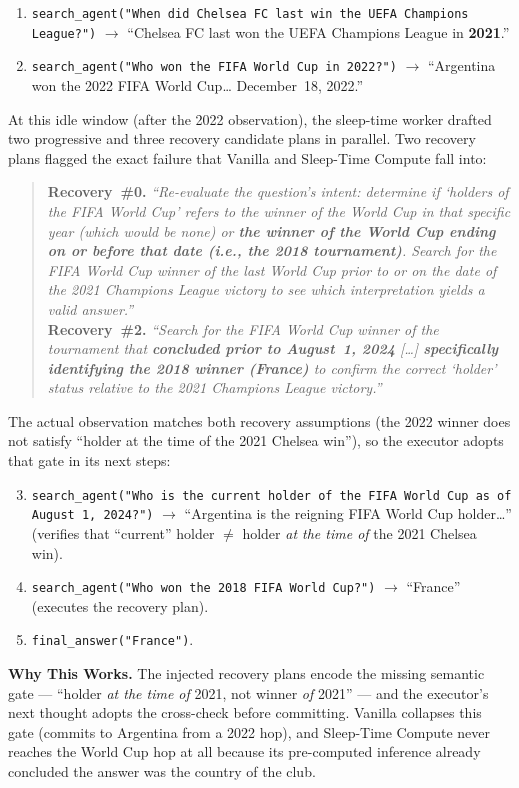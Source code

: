 \begin{tcolorbox}[colback=blue!4, colframe=blue!60!black, title=\textsc{\methodname{}} (Pred: France / GT: France), fontupper=\small, breakable]
\begin{enumerate}
  \item \texttt{search\_agent("When did Chelsea FC last win the UEFA Champions League?")} $\rightarrow$ ``Chelsea FC last won the UEFA Champions League in \textbf{2021}.''
  \item \texttt{search\_agent("Who won the FIFA World Cup in 2022?")} $\rightarrow$ ``Argentina won the 2022 FIFA World Cup\dots{} December~18, 2022.''
\end{enumerate}
At this idle window (after the 2022 observation), the sleep-time worker drafted two progressive and three recovery candidate plans in parallel. Two recovery plans flagged the exact failure that Vanilla and Sleep-Time Compute fall into:
\begin{quote}\small
\textbf{Recovery~\#0.} \textit{``Re-evaluate the question's intent: determine if `holders of the FIFA World Cup' refers to the winner of the World Cup \emph{in that specific year} (which would be none) or \textbf{the winner of the World Cup \emph{ending on or before that date} (i.e., the 2018 tournament)}. Search for the FIFA World Cup winner of the last World Cup prior to or on the date of the 2021 Champions League victory to see which interpretation yields a valid answer.''}\\[2pt]
\textbf{Recovery~\#2.} \textit{``Search for the FIFA World Cup winner of the tournament that \textbf{concluded prior to August~1, 2024} [\dots] \textbf{specifically identifying the 2018 winner (France)} to confirm the correct `holder' status relative to the 2021 Champions League victory.''}
\end{quote}
The actual observation matches both recovery assumptions (the 2022 winner does not satisfy ``holder at the time of the 2021 Chelsea win''), so the executor adopts that gate in its next steps:
\begin{enumerate}
\setcounter{enumi}{2}
  \item \texttt{search\_agent("Who is the current holder of the FIFA World Cup as of August~1, 2024?")} $\rightarrow$ ``Argentina is the reigning FIFA World Cup holder\dots'' (verifies that ``current'' holder $\ne$ holder \emph{at the time of} the 2021 Chelsea win).
  \item \texttt{search\_agent("Who won the 2018 FIFA World Cup?")} $\rightarrow$ ``France'' (executes the recovery plan).
  \item \texttt{final\_answer("France")}.
\end{enumerate}
\textbf{Why This Works.} The injected recovery plans encode the missing semantic gate --- ``holder \emph{at the time of} 2021, not winner \emph{of} 2021'' --- and the executor's next thought adopts the cross-check before committing. Vanilla collapses this gate (commits to Argentina from a 2022 hop), and Sleep-Time Compute never reaches the World Cup hop at all because its pre-computed inference already concluded the answer was the country of the club.
\end{tcolorbox}

